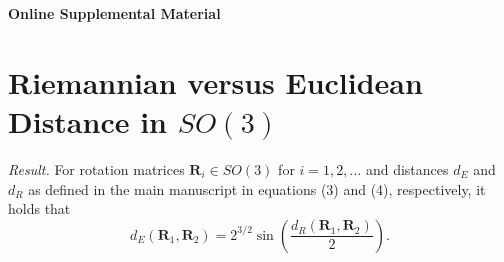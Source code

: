 \documentclass[12pt]{article}
\newcommand{\Rdist}{{d_R}}
\newcommand{\Edist}{{d_E}}
\begin{document}
\def\spacingset#1{\renewcommand{\baselinestretch}%
{#1}\small\normalsize} \spacingset{1}
\appendix
\spacingset{1.45} %
\begin{center}
\Large \textbf{Online Supplemental Material}
\end{center}
\section{Riemannian versus Euclidean Distance in $SO(3)$}
\label{sec:appendix2}
\textit{Result.} For rotation matrices $\bm R_i\in SO(3)$ for $i=1,2,\ldots$ and distances $d_E$ and $d_R$ as defined in the main manuscript in equations (3) and (4), respectively,  it holds that 
\begin{equation}
\label{EvR}
\Edist(\bm R_1,\bm R_2)=2^{3/2}\sin\left(\frac{\Rdist(\bm{R}_1,\bm{R}_2)}{2}\right)
.
\end{equation}
\end{document}
